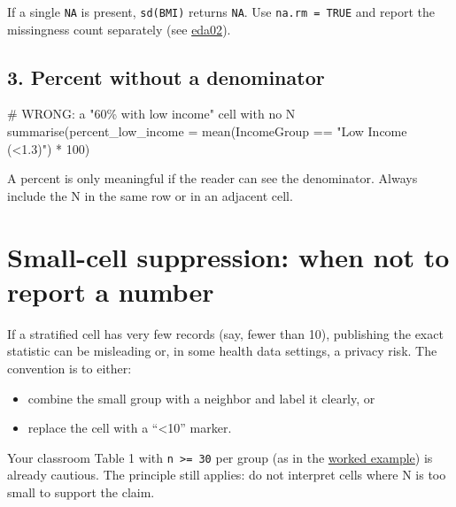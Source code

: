 \documentclass[
  letterpaper,
  DIV=11,
  numbers=noendperiod,
  oneside]{scrreprt}
\newenvironment{Shaded}{\begin{snugshade}}{\end{snugshade}}
\newcommand{\AttributeTok}[1]{\textcolor[rgb]{0.40,0.45,0.13}{#1}}
\newcommand{\CommentTok}[1]{\textcolor[rgb]{0.37,0.37,0.37}{#1}}
\newcommand{\DecValTok}[1]{\textcolor[rgb]{0.68,0.00,0.00}{#1}}
\newcommand{\FunctionTok}[1]{\textcolor[rgb]{0.28,0.35,0.67}{#1}}
\newcommand{\NormalTok}[1]{\textcolor[rgb]{0.00,0.23,0.31}{#1}}
\newcommand{\SpecialCharTok}[1]{\textcolor[rgb]{0.37,0.37,0.37}{#1}}
\newcommand{\StringTok}[1]{\textcolor[rgb]{0.13,0.47,0.30}{#1}}
\providecommand{\tightlist}{%
  \setlength{\itemsep}{0pt}\setlength{\parskip}{0pt}}
\begin{document}
If a single \texttt{NA} is present, \texttt{sd(BMI)} returns
\texttt{NA}. Use \texttt{na.rm\ =\ TRUE} and report the missingness
count separately (see \hyperref[cohort-and-missingness]{eda02}).

\subsection*{3. Percent without a
denominator}\label{percent-without-a-denominator}

\begin{Shaded}
\begin{Highlighting}[numbers=left,,]
\CommentTok{\# WRONG: a "60\% with low income" cell with no N}
\FunctionTok{summarise}\NormalTok{(}\AttributeTok{percent\_low\_income =} \FunctionTok{mean}\NormalTok{(IncomeGroup }\SpecialCharTok{==} \StringTok{"Low Income (\textless{}1.3)"}\NormalTok{) }\SpecialCharTok{*} \DecValTok{100}\NormalTok{)}
\end{Highlighting}
\end{Shaded}

A percent is only meaningful if the reader can see the denominator.
Always include the N in the same row or in an adjacent cell.

\section*{Small-cell suppression: when not to report a
number}\label{small-cell-suppression-when-not-to-report-a-number}


If a stratified cell has very few records (say, fewer than 10),
publishing the exact statistic can be misleading or, in some health data
settings, a privacy risk. The convention is to either:

\begin{itemize}
\tightlist
\item
  combine the small group with a neighbor and label it clearly, or
\item
  replace the cell with a ``\textless10'' marker.
\end{itemize}

Your classroom Table 1 with \texttt{n\ \textgreater{}=\ 30} per group
(as in the \hyperref[worked-example-eda-and-table-1]{worked example}) is
already cautious. The principle still applies: do not interpret cells
where N is too small to support the claim.
\end{document}

